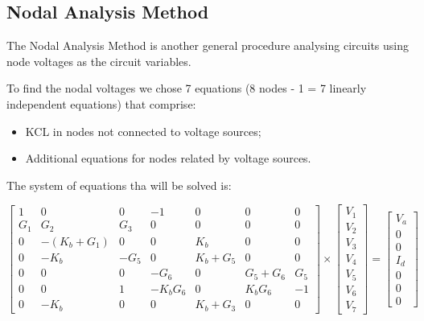 \subsection{Nodal Analysis Method}

\hspace{0,5cm} The Nodal Analysis Method is another general procedure analysing circuits using node voltages as the circuit variables. 

To find the nodal voltages we chose 7 equations (8 nodes - 1 = 7 linearly independent equations) that comprise:
\begin{itemize}
\item  KCL in nodes not connected to voltage sources;

\item Additional equations for nodes related by voltage sources.
\end{itemize}


The system of equations tha will be solved is:

\begin{equation}
\begin{bmatrix} 
1 & 0 & 0 & -1 & 0 & 0 & 0  \\ 
G_1 & G_2 & G_3 & 0 & 0 & 0 & 0  \\
0 & -(K_b + G_1) & 0 & 0 & K_b & 0 & 0 \\ 
0 & -K_b & -G_5 & 0 & K_b + G_5 & 0 & 0 \\
0 & 0 & 0 & -G_6 & 0 & G_5 + G_6 & G_5 \\ 
0 & 0 & 1 & -K_b G_6 & 0 & K_b G_6 & -1 \\
0 & -K_b & 0 & 0 & K_b + G_3 & 0 & 0 
\end{bmatrix} 
\times
\begin{bmatrix} 
V_1 \\ 
V_2 \\ 
V_3 \\ 
V_4 \\ 
V_5 \\ 
V_6 \\ 
V_7
\end{bmatrix} =
\begin{bmatrix} 
V_a \\ 
0 \\ 
0 \\ 
I_d \\ 
0 \\ 
0 \\ 
0
\end{bmatrix}
\end{equation}

\lipsum[1-1]


